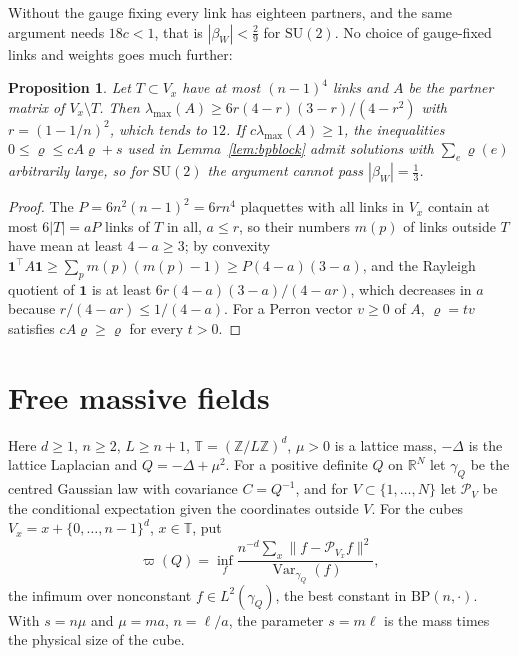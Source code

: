 \documentclass[11pt]{amsart}
\newtheorem{proposition}[theorem]{Proposition}
\theoremstyle{definition}
\theoremstyle{remark}
\numberwithin{equation}{section}
\newcommand{\R}{\mathbb{R}}
\newcommand{\Z}{\mathbb{Z}}
\newcommand{\SU}{\mathrm{SU}}
\newcommand{\Var}{\operatorname{Var}}
\newcommand{\BP}{\mathrm{BP}}
\begin{document}
Without the gauge fixing every link has eighteen partners, and the same
argument needs $18c<1$, that is $|\beta_W|<\frac29$ for $\SU(2)$. No choice of
gauge-fixed links and weights goes much further:

\begin{proposition}\label{prop:methodlimit}
Let $T\subset V_x$ have at most $(n-1)^4$ links and $A$ be the partner matrix
of $V_x\setminus T$. Then $\lambda_{\max}(A)\ge6r(4-r)(3-r)/(4-r^2)$ with
$r=(1-1/n)^2$, which tends to $12$. If $c\lambda_{\max}(A)\ge1$, the
inequalities $0\le\varrho\le cA\varrho+s$ used in Lemma~\ref{lem:bpblock}
admit solutions with $\sum_e\varrho(e)$ arbitrarily large, so for $\SU(2)$ the
argument cannot pass $|\beta_W|=\frac13$.
\end{proposition}

\begin{proof}
The $P=6n^2(n-1)^2=6rn^4$ plaquettes with all links in $V_x$ contain at most
$6|T|=aP$ links of $T$ in all, $a\le r$, so their numbers $m(p)$ of links outside
$T$ have mean at least $4-a\ge3$; by convexity $\mathbf1^{\top}A\mathbf1\ge
\sum_pm(p)(m(p)-1)\ge P(4-a)(3-a)$, and the Rayleigh quotient of $\mathbf1$ is
at least $6r(4-a)(3-a)/(4-ar)$, which decreases in $a$ because
$r/(4-ar)\le1/(4-a)$. For a Perron vector $v\ge0$ of $A$, $\varrho=tv$
satisfies $cA\varrho\ge\varrho$ for every $t>0$.
\end{proof}

\section{Free massive fields}\label{sec:free}

Here $d\ge1$, $n\ge2$, $L\ge n+1$, $\mathbb T=(\Z/L\Z)^d$, $\mu>0$ is a lattice
mass, $-\Delta$ is the lattice Laplacian and $Q=-\Delta+\mu^2$. For a positive
definite $Q$ on $\R^N$ let $\gamma_Q$ be the centred Gaussian law with
covariance $C=Q^{-1}$, and for $V\subset\{1,\dots,N\}$ let $\mathcal P_V$ be the
conditional expectation given the coordinates outside $V$. For the cubes
$V_x=x+\{0,\dots,n-1\}^d$, $x\in\mathbb T$, put
\begin{equation}\label{eq:ffvarpi}
\varpi(Q)=\inf_f\frac{n^{-d}\sum_x\|f-\mathcal P_{V_x}f\|^2}{\Var_{\gamma_Q}(f)},
\end{equation}
the infimum over nonconstant $f\in L^2(\gamma_Q)$, the best constant in
$\BP(n,\cdot)$. With $s=n\mu$ and $\mu=ma$, $n=\ell/a$, the parameter $s=m\ell$
is the mass times the physical size of the cube.
\end{document}
